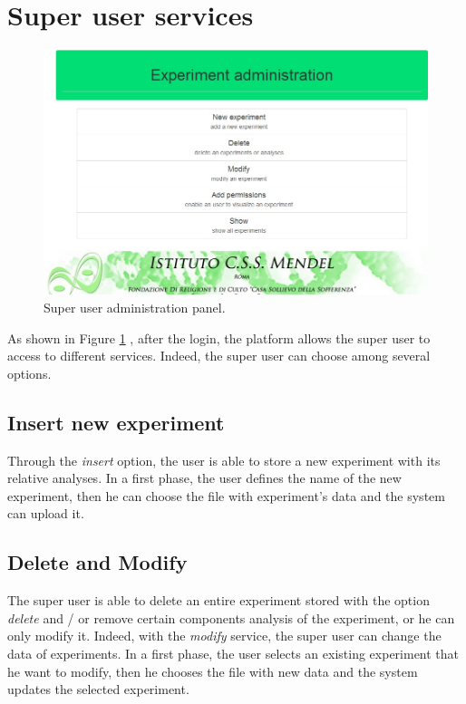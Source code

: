 \documentclass[a4paper]{report}
\begin{document}
\section{Super user services}

\begin{figure}[htb] 
\begin{center}
\includegraphics[scale=0.4]{figure/SUservices.jpg} 
\end{center}
\caption{Super user administration panel.}
\label{SUservices}
\end{figure}

As shown in Figure \ref{SUservices} , after the login, the platform allows the super user to access to different services. Indeed, the super user can choose among several options.

\subsection{Insert new experiment}
Through the \emph{insert} option, the user is able to store a new experiment with its relative analyses. In a first phase, the user defines the name of the new experiment, then he can choose the file with experiment's data and the system can upload it. 

\subsection{Delete and Modify}
The super user is able to delete an entire experiment stored with the option \emph{delete} and / or remove certain components analysis of the experiment, or he can only modify it. Indeed, with the \emph{modify} service, the super user can change the data of experiments. In a first phase, the user selects an existing  experiment that he want to modify, then he chooses the file with new data and the system updates the selected experiment.
\end{document}
